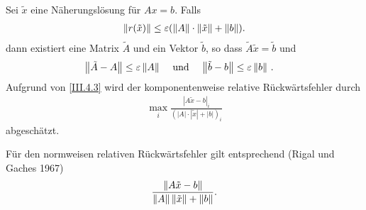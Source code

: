 \begin{Satze}\label{3.4.1}
  Sei $\tilde{x}$ eine Näherungslösung für $Ax= b$. Falls
  \begin{gather}\label{III.4.3}
    \nn[r(\tilde{x})]\leq\varepsilon(\nn[A]\cdot\nn[\tilde{x}]+\nn[b]).
  \end{gather}
  dann existiert eine Matrix $\tilde{ A}$  und ein
  Vektor $\tilde { b}$, so dass $\tilde{A}\tilde{x}=\tilde{b}$ und
  \begin{align}
    \nn[\tilde{A}-A]&\leq\varepsilon\nn[A]
    &\text{ und }&
    &\nn[\tilde{b}-b]&\leq \varepsilon \nn[b]\,.
    \label{III.4.4}
  \end{align}
  Aufgrund von \eqref{III.4.3} wird der komponentenweise relative
  Rückwärtsfehler durch 
  \begin{gather*}
    \max_i \frac{| A \tilde{ x} -  b|_i}
    { (| A|\cdot |\tilde{x}| + |b|)_i} 
  \end{gather*}
  abgeschätzt.
  
  Für den normweisen relativen Rückwärtsfehler gilt entsprechend
  (Rigal und Gaches 1967)
  \begin{gather*}
    \frac{\nn[A \tilde{x} -  b]}
    { \nn[A] \nn[\tilde{x}] + \nn[b] } .
  \end{gather*}
\end{Satze}

